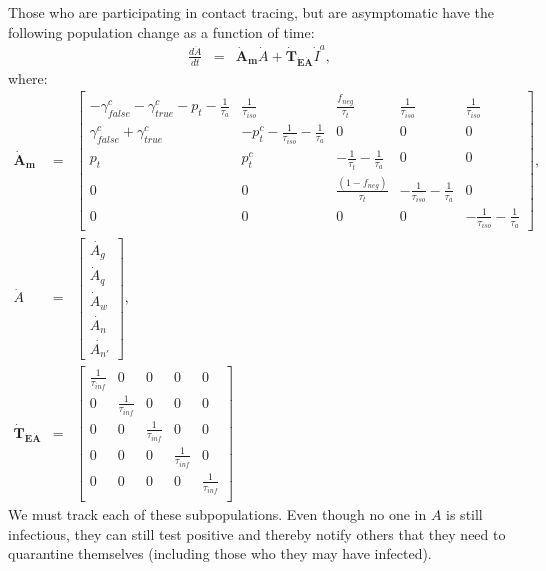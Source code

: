 \documentclass[notitlepage, superscriptaddress]{revtex4-2}
\begin{document}
Those who are participating in contact tracing, but are asymptomatic have the following population change as a function of time:
\begin{eqnarray}
\frac{d\dot{A}}{dt} &=& \boldsymbol{\dot{A}_{m}}  \dot{A} + \boldsymbol{\dot{T}_{\dot{E}\dot{A}}}  \dot{I}^{a}, 
\end{eqnarray}
where:
%
\begin{eqnarray}
\boldsymbol{\dot{A}_{m}}&=&
\begin{bmatrix}
 -\gamma^{c}_{false} -\gamma^{c}_{true} - p_{t} -\frac{1}{\tau_{a}} & \frac{1}{\tau_{iso}}  & \frac{f_{neg}}{\tau_{t}} & \frac{1}{\tau_{iso}} & \frac{1}{\tau_{iso}} \\
\gamma^{c}_{false} + \gamma^{c}_{true}    &  -p^{c}_{t}  - \frac{1}{\tau_{iso}} - \frac{1}{\tau_{a}}      &  0    & 0  & 0\\
p_{t}     &  p^{c}_{t}                  &  -\frac{1}{\tau_{t}}  - \frac{1}{\tau_{a}}  & 0 & 0\\
0 & 0 & \frac{(1-f_{neg})}{\tau_{t}}  & -\frac{1}{\tau_{iso}}  -  \frac{1}{\tau_{a}} & 0 \\ 
0 & 0 & 0 & 0 & -\frac{1}{\tau_{iso}}  -  \frac{1}{\tau_{a}}
\end{bmatrix}, \\ 
%
\dot{A} &=& 
\begin{bmatrix}
\dot{A_{g}} \\ \dot{A}_{q} \\ \dot{A}_{w}\\ \dot{A_{n}} \\ \dot{A_{n'}}
\end{bmatrix}, \\ 
%
% 
\boldsymbol{\dot{T}_{\dot{E}\dot{A}}} &=&
\begin{bmatrix}
\frac{1}{\tau_{inf}}  & 0                 & 0 & 0 & 0\\ 
 0          &  \frac{1}{\tau_{inf}}  & 0 & 0 & 0 \\ 
 0          & 0                 &  \frac{1}{\tau_{inf}} & 0 & 0 \\ 
0           & 0                 &  0 & \frac{1}{\tau_{inf}} & 0 \\ 
0           & 0                 &  0 & 0 & \frac{1}{\tau_{inf}} \\
\end{bmatrix}
\end{eqnarray}
We must track each of these subpopulations. Even though no one in $A$ is still infectious, they can still test positive and thereby notify others that they need to quarantine themselves (including those who they may have infected). 
\end{document}
